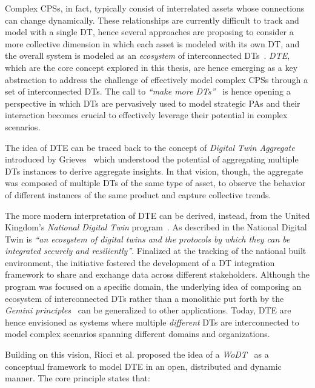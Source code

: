 Complex \acp{CPS}, in fact, typically consist of interrelated assets whose connections can change dynamically.
%
These relationships are currently difficult to track and model with a single \ac{DT}, hence several approaches are proposing to consider a more collective dimension in which each asset is modeled with its own \ac{DT}, and the overall system is modeled as an \emph{ecosystem} of interconnected \acp{DT}~\cite{web-of-dt-ricci-2022}.
%
\emph{\ac{DTE}}, which are the core concept explored in this thesis, are hence emerging as a key abstraction to address the challenge of effectively model complex \acp{CPS} through a set of interconnected \acp{DT}.
%
The call to \emph{``make more \aclp{DT}''}~\cite{nature_make_moredt} is hence opening a perspective in which \acp{DT} are pervasively used to model strategic \acp{PA} and their interaction becomes crucial to effectively leverage their potential in complex scenarios.

The idea of \ac{DTE} can be traced back to the concept of \emph{Digital Twin Aggregate} introduced by Grieves~\cite{Grieves_2023} which understood the potential of aggregating multiple \acp{DT} instances to derive aggregate insights.
%
In that vision, though, the aggregate was composed of multiple \acp{DT} of the same type of asset, to observe the behavior of different instances of the same product and capture collective trends.

The more modern interpretation of \ac{DTE} can be derived, instead, from the United Kingdom's \textit{National Digital Twin} program~\cite{bulter2018geminiprinciples}.
%
As described in \cite{kendall2021ndt} the National Digital Twin is \emph{``an ecosystem
of digital twins and the protocols by which
they can be integrated securely and
resiliently''}.
%
Finalized at the tracking of the national built environment, the initiative fostered the development of a \ac{DT} integration framework to share and exchange data across different stakeholders.
%
Although the program was focused on a specific domain, the underlying idea of composing an ecosystem of interconnected \acp{DT} rather than a monolithic put forth by the \emph{Gemini principles}~\cite{bulter2018geminiprinciples} can be generalized to other applications.
%
Today, \ac{DTE} are hence envisioned as systems where multiple \emph{different} \acp{DT} are interconnected to model complex scenarios spanning different domains and organizations.

Building on this vision, Ricci et al. proposed the idea of a \emph{\ac{WoDT}}~\cite{web-of-dt-ricci-2022} as a conceptual framework to model \ac{DTE} in an open, distributed and dynamic manner.
The core principle states that:


